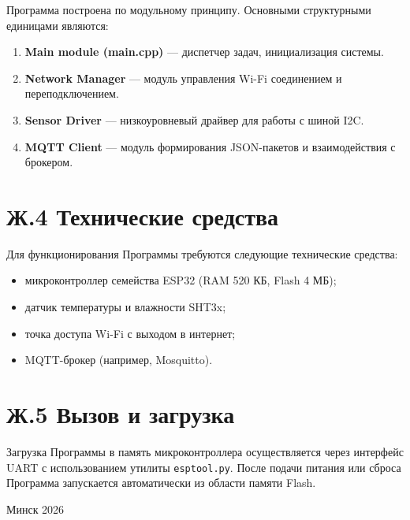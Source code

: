 Программа построена по модульному принципу. Основными структурными единицами являются:
\begin{enumerate}
    \item \textbf{Main module (main.cpp)} --- диспетчер задач, инициализация системы.
    \item \textbf{Network Manager} --- модуль управления Wi-Fi соединением и переподключением.
    \item \textbf{Sensor Driver} --- низкоуровневый драйвер для работы с шиной I2C.
    \item \textbf{MQTT Client} --- модуль формирования JSON-пакетов и взаимодействия с брокером.
\end{enumerate}



\section*{Ж.4 Технические средства}

Для функционирования Программы требуются следующие технические средства:
\begin{itemize}
    \item микроконтроллер семейства ESP32 (RAM 520 КБ, Flash 4 МБ);
    \item датчик температуры и влажности SHT3x;
    \item точка доступа Wi-Fi с выходом в интернет;
    \item MQTT-брокер (например, Mosquitto).
\end{itemize}

\section*{Ж.5 Вызов и загрузка}

Загрузка Программы в память микроконтроллера осуществляется через интерфейс UART с использованием утилиты \texttt{esptool.py}. После подачи питания или сброса Программа запускается автоматически из области памяти Flash.

\vfill
\begin{center}
    Минск 2026
\end{center}
\newpage